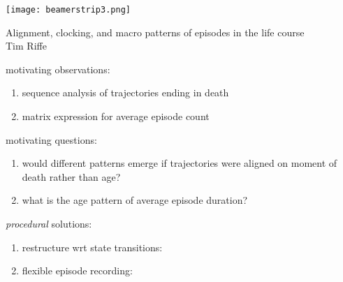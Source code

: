 \documentclass[20pt,usenames,dvipsnames]{beamer}
\begin{document}

\begin{frame}[plain]
	\vspace{-3cm}
 \centerline{\texttt{[image: beamerstrip3.png]}}

	
	\huge
	\vspace{1em}
	
	Alignment, clocking, and macro patterns of episodes in the life course\\
	\vspace{1em}
	\large 
	Tim Riffe 
\end{frame}

\begin{frame}[plain]
\Large
{} motivating observations:\vspace{2em}
 \begin{enumerate}[<+->]
 \item sequence analysis of trajectories ending in death  
 \item matrix expression for average episode count  
 \end{enumerate}
\end{frame}
%

\begin{frame}[plain]
\Large
{} motivating questions:\vspace{2em}
 \begin{enumerate}
 \item would different patterns emerge if trajectories were aligned on moment of death rather than age?
 \item what is the age pattern of average episode duration?
 \end{enumerate}
\end{frame}
%

\begin{frame}[plain]
\Large
{} \emph{procedural} solutions:\vspace{2em}
 \begin{enumerate}
 \item restructure wrt state transitions: 
 \item flexible episode recording: 
 \end{enumerate}
\end{frame}
%
\end{document}
